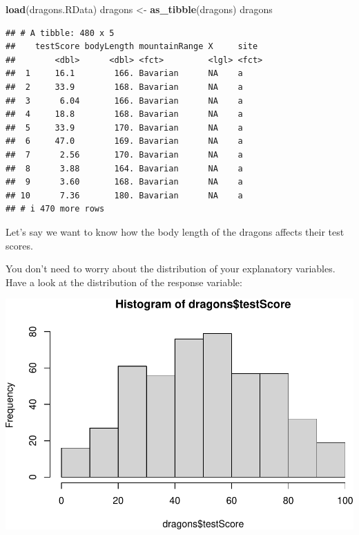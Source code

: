 \documentclass[
]{article}
\newenvironment{Shaded}{\begin{snugshade}}{\end{snugshade}}
\newcommand{\CommentTok}[1]{\textcolor[rgb]{0.56,0.35,0.01}{\textit{#1}}}
\newcommand{\FunctionTok}[1]{\textcolor[rgb]{0.13,0.29,0.53}{\textbf{#1}}}
\newcommand{\NormalTok}[1]{#1}
\newcommand{\OtherTok}[1]{\textcolor[rgb]{0.56,0.35,0.01}{#1}}
\newcommand{\SpecialCharTok}[1]{\textcolor[rgb]{0.81,0.36,0.00}{\textbf{#1}}}
\newcommand{\StringTok}[1]{\textcolor[rgb]{0.31,0.60,0.02}{#1}}
\begin{document}
\begin{Shaded}
\begin{Highlighting}[]
\FunctionTok{load}\NormalTok{(}\StringTok{\textquotesingle{}dragons.RData\textquotesingle{}}\NormalTok{)}
\NormalTok{dragons }\OtherTok{\textless{}{-}} \FunctionTok{as\_tibble}\NormalTok{(dragons)}
\NormalTok{dragons}
\end{Highlighting}
\end{Shaded}

\begin{verbatim}
## # A tibble: 480 x 5
##    testScore bodyLength mountainRange X     site 
##        <dbl>      <dbl> <fct>         <lgl> <fct>
##  1     16.1        166. Bavarian      NA    a    
##  2     33.9        168. Bavarian      NA    a    
##  3      6.04       166. Bavarian      NA    a    
##  4     18.8        168. Bavarian      NA    a    
##  5     33.9        170. Bavarian      NA    a    
##  6     47.0        169. Bavarian      NA    a    
##  7      2.56       170. Bavarian      NA    a    
##  8      3.88       164. Bavarian      NA    a    
##  9      3.60       168. Bavarian      NA    a    
## 10      7.36       180. Bavarian      NA    a    
## # i 470 more rows
\end{verbatim}

Let's say we want to know how the body length of the dragons affects
their test scores.

You don't need to worry about the distribution of your explanatory
variables. Have a look at the distribution of the response variable:

\begin{Shaded}
\end{Shaded}

\begin{center}\includegraphics{Introduction-to-linear-mixed-models_files/figure-latex/unnamed-chunk-2-1} \end{center}
\end{document}
